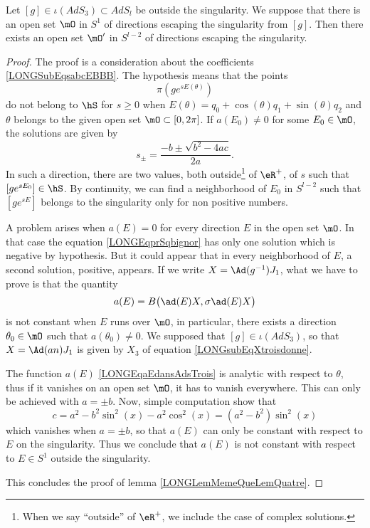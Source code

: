 %
\begin{lemma}        \label{LONGLemMemeQueLemQuatre}
    Let $[g]\in\iota(AdS_3)\subset AdS_l$ be outside the singularity. We suppose that there is an open set $\mO$ in $S^1$ of directions escaping the singularity from $[g]$. Then there exists an open set $\mO'$ in $S^{l-2}$ of directions escaping the singularity.
\end{lemma}

\begin{proof}
    The proof is a consideration about the coefficients \eqref{LONGSubEqsabcEBBB}. The hypothesis means that the points
\begin{equation}
    \pi\left( g e^{sE(\theta)} \right)
\end{equation}
do not belong to $\hS$ for $s\geq 0$ when $E(\theta)=q_0+\cos(\theta)q_1+\sin(\theta)q_2$ and $\theta$ belongs to the given open set $\mO\subset\mathopen[ 0 , 2\pi \mathclose]$. If $a(E_0)\neq 0$ for some $E_0\in\mO$, the solutions are given by
\begin{equation}
    s_{\pm}=\frac{ -b\pm\sqrt{b^2-4ac} }{ 2a }.
\end{equation}
In such a direction, there are two values, both outside\footnote{When we say ``outside'' of $\eR^+$, we include the case of complex solutions.} of $\eR^+$, of $s$ such that $[g e^{sE_0}]\in \hS$. By continuity, we can find a neighborhood of $E_0$ in $S^{l-2}$ such that $[g e^{sE}]$ belongs to the singularity only for non positive numbers.

A problem arises when $a(E)=0$ for every direction $E$ in the open set $\mO$. In that case the equation \eqref{LONGEqprSqbignor} has only one solution which is negative by hypothesis. But it could appear that in every neighborhood of $E$, a second solution, positive, appears. If we write $X=\Ad(g^{-1})J_1$, what we have to prove is that the quantity
\begin{equation}
    a(E)=B\big( \ad(E)X,\sigma\ad(E)X \big)
\end{equation}
is not constant when $E$ runs over $\mO$, in particular, there exists a direction $\theta_0\in\mO$ such that $a(\theta_0)\neq 0$. We supposed that $[g]\in \iota(AdS_3)$, so that $X=\Ad(an)J_1$ is given by $X_3$ of equation \eqref{LONGsubEqXtroisdonne}.


The function $a(E)$ \eqref{LONGEqaEdansAdsTrois} is analytic with respect to $\theta$, thus if it vanishes on an open set $\mO$, it has to vanish everywhere. This can only be achieved with $a=\pm b$. Now, simple computation show that
\begin{equation}
    c=a^2-b^2\sin^2(x)-a^2\cos^2(x)=(a^2-b^2)\sin^2(x)
\end{equation}
which vanishes when $a=\pm b$, so that $a(E)$ can only be constant with respect to $E$ on the singularity. Thus we conclude that $a(E)$ is not constant with respect to $E\in S^1$ outside the singularity.

This concludes the proof of lemma \ref{LONGLemMemeQueLemQuatre}.
\end{proof}
%

